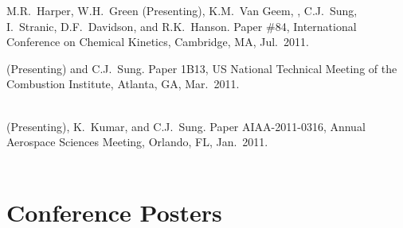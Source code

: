 \begin{bibmune}
\item M.R.\ Harper, W.H.\ Green (Presenting), K.M.\ Van Geem,
        , C.J.\ Sung, I.\ Stranic, D.F.\ Davidson,
        and R.K.\ Hanson.  Paper \#84,  International
        Conference on Chemical Kinetics, Cambridge, MA, Jul.\ 2011.

\item {} (Presenting) and C.J.\ Sung.
         Paper 1B13,   US National Technical
        Meeting of the Combustion Institute, Atlanta, GA, Mar.\ 2011.\\
        \\

\item {} (Presenting), K.\ Kumar, and C.J.\ Sung.
         Paper AIAA-2011-0316,
         Annual Aerospace Sciences Meeting,
        Orlando, FL, Jan.\ 2011.\\
        \\
\end{bibmune}

\section{{\sectionfont Conference Posters}}

